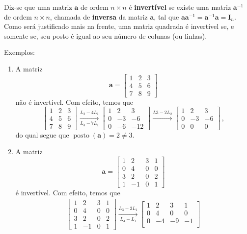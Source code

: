 \documentclass[12pt,a4paper]{report}
\newcommand{\mb}{\mathbf}
\DeclareMathOperator{\posto}{posto}
\begin{document}
Diz-se que uma matriz $\mb a$ de ordem $n\times n$ é \textbf{invertível} se existe uma matriz $\mb a^{-1}$ de ordem $n\times n$, chamada de \textbf{inversa} da matriz $\mb a$, tal que $\mb a\mb a^{-1}=\mb a^{-1}\mb a=\mb I_n$. Como será justificado mais na frente, uma matriz quadrada é invertível se, e somente se, seu posto é igual ao seu número de colunas (ou linhas).

Exemplos:
\begin{enumerate}
  \item A matriz
  $$\mb a=\begin{bmatrix}
    1&2&3\\
    4&5&6\\
    7&8&9
  \end{bmatrix}$$
  não é invertível. Com efeito, temos que
  $$\begin{bmatrix}
    1&2&3\\
    4&5&6\\
    7&8&9
  \end{bmatrix}\xrightarrow[L_3-7L_1]{L_2-4L_1} \begin{bmatrix}
    1&2&3\\
    0&-3&-6\\
    0&-6&-12
  \end{bmatrix}\xrightarrow{L3-2L_2} \begin{bmatrix}
    1&2&3\\
    0&-3&-6\\
    0&0&0
  \end{bmatrix}\,,$$
  do qual segue que $\posto(\mb a)=2\ne 3$.
  \item A matriz
  $$\mb a=\begin{bmatrix}
    1&2&3&1\\
    0&4&0&0\\
    3&2&0&2\\
    1&-1&0&1
  \end{bmatrix}$$
  é invertível. Com efeito, temos que
  \begin{multline*}
    \begin{bmatrix}
      1&2&3&1\\
      0&4&0&0\\
      3&2&0&2\\
      1&-1&0&1
    \end{bmatrix}\xrightarrow[L_4-L_1]{L_3-3L_1} \begin{bmatrix}
      1&2&3&1\\
      0&4&0&0\\
      0&-4&-9&-1\\

\end{bmatrix}
\end{multline*}
\end{enumerate}
\end{document}
